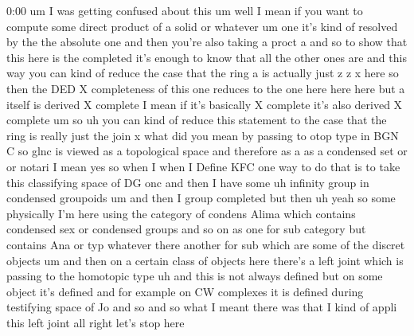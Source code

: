 \begin{unfinished}{0:00}
um  I  was  getting  confused  about  this
um  well  I  mean  if  you  want  to  compute
some
direct  product  of
a  solid  or  whatever
um
one  it's  kind  of  resolved  by  the  the
absolute  one  and
then  you're  also  taking  a  proct
a  and  so  to  show  that  this  here  is  the
completed  it's  enough  to  know  that  all
the  other  ones  are  and  this  way  you  can
kind  of  reduce  the  case  that  the  ring  a
is  actually  just
z  z  x
here  so  then  the  DED  X  completeness  of
this  one  reduces  to  the  one  here  here
here  but  a  itself  is  derived  X  complete
I  mean  if  it's  basically  X  complete  it's
also  derived  X  complete  um  so
uh  you  can  kind  of  reduce  this  statement
to  the  case  that  the  ring  is  really  just
the  join
x  what  did  you  mean  by  passing  to  otop
type  in  BGN  C  so
glnc  is  viewed  as  a  topological  space
and  therefore  as  a  as  a  condensed  set  or
or  notari  I  mean  yes  so  when  I  when  I
Define  KFC  one  way  to  do  that  is  to  take
this  classifying  space  of  DG  onc  and
then  I  have
some  uh  infinity  group  in  condensed
groupoids  um  and  then  I  group
completed  but
then
uh  yeah  so  some  physically  I'm  here
using  the  category  of  condens
Alima  which  contains  condensed  sex  or
condensed  groups  and  so  on  as  one  for
sub
category  but  contains  Ana  or  typ
whatever  there  another  for  sub  which  are
some  of  the  discret
objects  um
and  then  on  a  certain  class  of  objects
here  there's  a  left  joint  which  is
passing  to  the  homotopic  type  uh  and
this  is  not  always  defined  but  on  some
object  it's  defined  and  for  example  on
CW  complexes  it  is  defined  during
testifying  space  of  Jo  and  so  and  so
what  I  meant  there  was  that  I  kind  of
appli  this  left
joint
all  right  let's  stop
here
\end{unfinished}